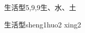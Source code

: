 \begin{entry}{生活型}{5,9,9}{⽣、⽔、⼟}
  \begin{phonetics}{生活型}{sheng1huo2 xing2}
  \end{phonetics}
\end{entry}
